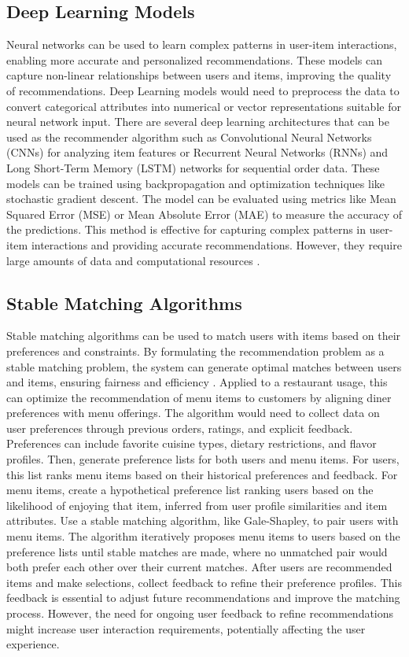 \subsection*{Deep Learning Models}
Neural networks can be used to learn complex patterns in user-item interactions, enabling more accurate and personalized recommendations. These models can capture non-linear relationships between users and items, improving the quality of recommendations. Deep Learning models would need to preprocess the data to convert categorical attributes into numerical or vector representations suitable for neural network input. There are several deep learning architectures that can be used as the recommender algorithm such as Convolutional Neural Networks (CNNs) for analyzing item features or Recurrent Neural Networks (RNNs) and Long Short-Term Memory (LSTM) networks for sequential order data. These models can be trained using backpropagation and optimization techniques like stochastic gradient descent. The model can be evaluated using metrics like Mean Squared Error (MSE) or Mean Absolute Error (MAE) to measure the accuracy of the predictions. This method is effective for capturing complex patterns in user-item interactions and providing accurate recommendations. However, they require large amounts of data and computational resources \cite{31}.

\subsection*{Stable Matching Algorithms}
Stable matching algorithms can be used to match users with items based on their preferences and constraints. By formulating the recommendation problem as a stable matching problem, the system can generate optimal matches between users and items, ensuring fairness and efficiency \cite{32}. Applied to a restaurant usage, this can optimize the recommendation of menu items to customers by aligning diner preferences with menu offerings. The algorithm would need to collect data on user preferences through previous orders, ratings, and explicit feedback. Preferences can include favorite cuisine types, dietary restrictions, and flavor profiles. Then, generate preference lists for both users and menu items. For users, this list ranks menu items based on their historical preferences and feedback. For menu items, create a hypothetical preference list ranking users based on the likelihood of enjoying that item, inferred from user profile similarities and item attributes. Use a stable matching algorithm, like Gale-Shapley, to pair users with menu items. The algorithm iteratively proposes menu items to users based on the preference lists until stable matches are made, where no unmatched pair would both prefer each other over their current matches. After users are recommended items and make selections, collect feedback to refine their preference profiles. This feedback is essential to adjust future recommendations and improve the matching process. However, the need for ongoing user feedback to refine recommendations might increase user interaction requirements, potentially affecting the user experience.


